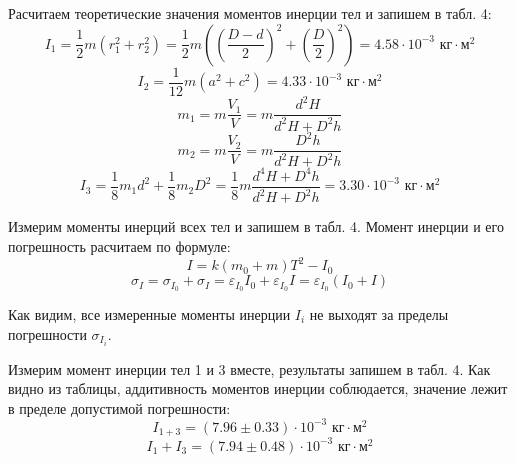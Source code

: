 \documentclass[12pt]{article}
\begin{document}
		Расчитаем теоретические значения моментов инерции тел и запишем в табл. 4:
		\[I_1 = \frac{1}{2}m\left(r_1^2+r_2^2\right) = \frac{1}{2}m\left(\left(\frac{D - d}{2}\right)^2 + \left(\frac{D}{2}\right)^2\right) = 4.58 \cdot 10^{-3} \text{ кг}\cdot\text{м}^2\]
		\[I_2 = \frac{1}{12}m\left(a^2+c^2\right) =  4.33 \cdot 10^{-3} \text{ кг}\cdot\text{м}^2\]
		\newpage
		\[m_1 = m\dfrac{V_1}{V} = m\dfrac{d^2H}{d^2H+D^2h}\]
		\[m_2 = m\dfrac{V_2}{V} = m\dfrac{D^2h}{d^2H+D^2h}\]
		\[I_3 = \frac{1}{8}m_1d^2 + \frac{1}{8}m_2D^2 = \dfrac{1}{8}m\dfrac{d^4H + D^4h}{d^2H+D^2h} = 3.30 \cdot 10^{-3} \text{ кг}\cdot\text{м}^2\] 
		\item Измерим моменты инерций всех тел и запишем в табл. 4. Момент инерции и его погрешность расчитаем по формуле:
		\[I = k(m_0+m)T^2 - I_0\]
		\[\sigma_I = \sigma_{I_0} + \sigma_{I} = \varepsilon_{I_0}I_0 + \varepsilon_{I_0}I = \varepsilon_{I_0} (I_0 + I)\]
		
		Как видим, все измеренные моменты инерции $I_i$ не выходят за пределы погрешности $\sigma_{I_i}$.
		
		\item Измерим момент инерции тел 1 и 3 вместе, результаты запишем в табл. 4. Как видно из таблицы, аддитивность моментов инерции соблюдается, значение лежит в пределе допустимой погрешности:
		\[I_{1+3} = (7.96 \pm 0.33) \cdot 10^{-3} \text{ кг}\cdot\text{м}^2\]
		\[I_1 + I_3 = (7.94 \pm 0.48) \cdot 10^{-3} \text{ кг}\cdot\text{м}^2\]
		
\end{document}
